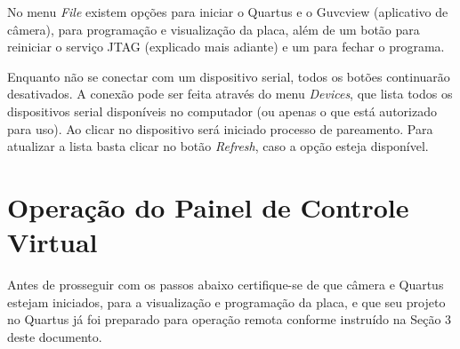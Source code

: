 \documentclass[12pt]{article}
\begin{document}
No menu \textit{File} existem opções para iniciar o Quartus e o Guvcview (aplicativo de câmera), para programação e visualização da placa, além de um botão para reiniciar o serviço JTAG (explicado mais adiante) e um para fechar o programa.

Enquanto não se conectar com um dispositivo serial, todos os botões continuarão desativados.
A conexão pode ser feita através do menu \textit{Devices}, que lista todos os dispositivos serial disponíveis no computador (ou apenas o que está autorizado para uso).
Ao clicar no dispositivo será iniciado processo de pareamento.
Para atualizar a lista basta clicar no botão \textit{Refresh}, caso a opção esteja disponível.

\section{Operação do Painel de Controle Virtual}
Antes de prosseguir com os passos abaixo certifique-se de que câmera e Quartus estejam iniciados, para a visualização e programação da placa, e que seu projeto no Quartus já foi preparado para operação remota conforme instruído na Seção 3 deste documento.
\end{document}
